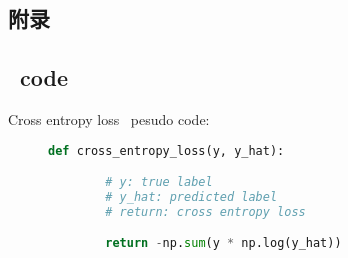 \begin{appendices}
    \section*{附录}
    
    
    \renewcommand{\thesubsection}{\Alph{subsection}} %
    \setcounter{table}{0}
    \renewcommand{\thetable}{\thesubsection.\arabic{table}}
    
    \subsection{\np\ code}
    Cross entropy loss \np\ pesudo code:
    \begin{figure}[H]
    \centering
    \begin{lstlisting}[language=Python, caption={Cross Entropy Loss}, label={lst:loss}]
    def cross_entropy_loss(y, y_hat):

        # y: true label
        # y_hat: predicted label
        # return: cross entropy loss

        return -np.sum(y * np.log(y_hat))
    \end{lstlisting}
    \end{figure}
\end{appendices}
    
    \newpage
    